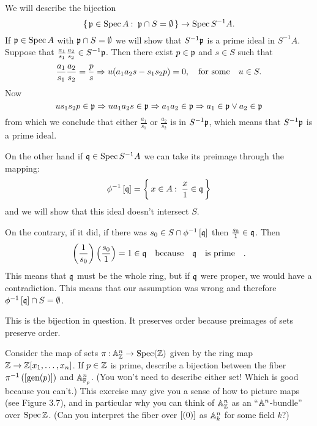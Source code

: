 \documentclass[12pt]{memoir}
\begin{document}
\begin{ptcbr}
   We will describe the bijection 
   $$\{\,\mathfrak{p}\in\operatorname{Spec} A\mathbin{:}\ \mathfrak{p}\cap S=\emptyset\,\}\to\operatorname{Spec} S^{-1}A.$$
   If $\mathfrak{p}\in\operatorname{Spec} A$ with $\mathfrak{p}\cap S=\emptyset$ we will show that $S^{-1}\mathfrak{p}$ is a prime ideal in $S^{-1}A$. Suppose that $\frac{a_1}{s_1}\frac{a_2}{s_2}\in S^{-1}\mathfrak{p}$. Then there exist $p\in\mathfrak{p}$ and $s\in S$ such that 
   $$\frac{a_1}{s_1}\frac{a_2}{s_2}=\frac{p}{s}\Rightarrow u(a_1a_2s-s_1s_2p)=0,\quad\text{for some}\quad u\in S.$$
   Now 
   $$us_1s_2p\in\mathfrak{p}\Rightarrow ua_1a_2s\in\mathfrak{p}\Rightarrow a_1a_2\in\mathfrak{p}\Rightarrow a_1\in\mathfrak{p}\lor a_2\in\mathfrak{p}$$
   from which we conclude that either $\frac{a_1}{s_1}$ or $\frac{a_2}{s_2}$ is in $S^{-1}\mathfrak{p}$, which means that $S^{-1}\mathfrak{p}$ is a prime ideal.\par 
   On the other hand if $\mathfrak{q}\in\operatorname{Spec} S^{-1}A$ we can take its preimage through the mapping:
   $$\phi^{-1}\left\lbrack\mathfrak{q}\right\rbrack=\biggl\{\,x\in A\mathbin{:}\ \frac x1\in\mathfrak{q}\,\biggr\}$$ 
   and we will show that this ideal doesn't intersect $S$.\par 
   On the contrary, if it did, if there was $s_0\in S\cap\phi^{-1}\left\lbrack\mathfrak{q}\right\rbrack$ then $\frac{s_0}{1}\in\mathfrak{q}$. Then 
   $$\left(\frac{1}{s_0}\right)\left(\frac{s_0}{1}\right)=1\in\mathfrak{q}\quad\text{because}\quad\mathfrak{q}\quad\text{is prime}\quad.$$
   This means that $\mathfrak{q}$ must be the whole ring, but if $\mathfrak{q}$ were proper, we would have a contradiction. This means that our assumption was wrong and therefore $\phi^{-1}\left\lbrack\mathfrak{q}\right\rbrack\cap S=\emptyset$.\par 
   This is the bijection in question. It preserves order because preimages of sets preserve order.
\end{ptcbr}
\iffalse
\begin{Ej}[3.2.Q Vakil]
    Consider the map of sets $\pi\mathbin{:}\mathbb{A}^n_{\mathbb{Z}}\to\operatorname{Spec}(\mathbb{Z})$
given by the ring map $\mathbb{Z}\to\mathbb{Z}[x_1,\dots,x_n]$. If $p\in\mathbb{Z}$ is prime, describe a bijection between the fiber $\pi^{-1}\left(\left\lbrack\operatorname{gen}(p)\right\rbrack\right)$ and $\mathbb{A}_{\mathbb{F}_p}^n$. (You won't need to describe either set! Which is good because you can't.) This exercise may give you a sense of how to picture maps (see Figure 3.7), and in particular why you can think of $\mathbb{A}^n_{\mathbb{Z}}$ as an “$\mathbb{A}^n$-bundle” over $\operatorname{Spec}\mathbb{Z}$. (Can you interpret the fiber over $\left\lbrack(0)\right\rbrack$ as $\mathbb{A}^n_k$ for some field $k$?)
\end{Ej}

\begin{ptcbr}

\end{ptcbr}
\end{document}
